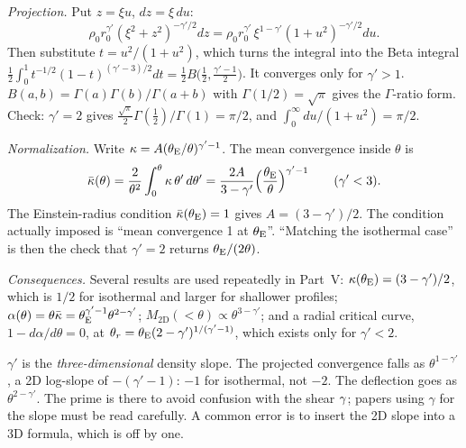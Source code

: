 \begin{derivation}
\textit{Projection.}  Put $z = \xi u$, $dz = \xi\,du$:
\[
  \rho_0 r_0^{\gamma'}(\xi^2 + z^2)^{-\gamma'/2}dz
  = \rho_0 r_0^{\gamma'}\,\xi^{1-\gamma'}(1+u^2)^{-\gamma'/2}du .
\]
Then substitute $t = u^2/(1+u^2)$, which turns the integral into the Beta
integral $\tfrac12\int_0^1 t^{-1/2}(1-t)^{(\gamma'-3)/2}dt =
\tfrac12 B\big(\tfrac12,\tfrac{\gamma'-1}{2}\big)$.  It converges only for
$\gamma' > 1$.  $B(a,b) = \Gamma(a)\Gamma(b)/\Gamma(a+b)$ with
$\Gamma(1/2) = \sqrt\pi$ gives the $\Gamma$-ratio form.  Check:
$\gamma' = 2$ gives $\tfrac{\sqrt\pi}{2}\Gamma(\tfrac12)/\Gamma(1) = \pi/2$,
and $\int_0^\infty du/(1+u^2) = \pi/2$.

\textit{Normalization.}  Write $\kappa = A(\theta_{\mathrm{E}}/\theta)^{\gamma'-1}$.  The
mean convergence inside $\theta$ is
\[
  \bar{\kappa}(\theta) = \frac{2}{\theta^2}\int_0^\theta\kappa\,\theta'\,d\theta'
  = \frac{2A}{3-\gamma'}\Big(\frac{\theta_{\mathrm{E}}}{\theta}\Big)^{\gamma'-1}
  \qquad (\gamma' < 3).
\]
The Einstein-radius condition $\bar{\kappa}(\theta_{\mathrm{E}}) = 1$ gives
$A = (3-\gamma')/2$.  The condition actually imposed is ``mean convergence
1 at $\theta_{\mathrm{E}}$''.  ``Matching the isothermal case'' is then the check that
$\gamma' = 2$ returns $\theta_{\mathrm{E}}/(2\theta)$.

\textit{Consequences.}  Several results are used repeatedly in Part~V:
$\kappa(\theta_{\mathrm{E}}) = (3-\gamma')/2$, which is $1/2$ for isothermal and
larger for shallower profiles;
$\alpha(\theta) = \theta\bar{\kappa} = \theta_{\mathrm{E}}^{\gamma'-1}\theta^{2-\gamma'}$;
$M_{\mathrm{2D}}(<\theta) \propto \theta^{3-\gamma'}$; and a radial
critical curve, $1 - d\alpha/d\theta = 0$, at
$\theta_r = \theta_{\mathrm{E}}(2-\gamma')^{1/(\gamma'-1)}$, which exists only for
$\gamma' < 2$.
\end{derivation}

\begin{annotation}
$\gamma'$ is the \emph{three-dimensional} density slope.  The projected
convergence falls as $\theta^{1-\gamma'}$, a 2D log-slope of $-(\gamma'-1)$:
$-1$ for isothermal, not $-2$.  The deflection goes as $\theta^{2-\gamma'}$.
The prime is there to avoid confusion with the shear $\gamma$; papers using
$\gamma$ for the slope must be read carefully.  A common error is to insert
the 2D slope into a 3D formula, which is off by one.
\end{annotation}


